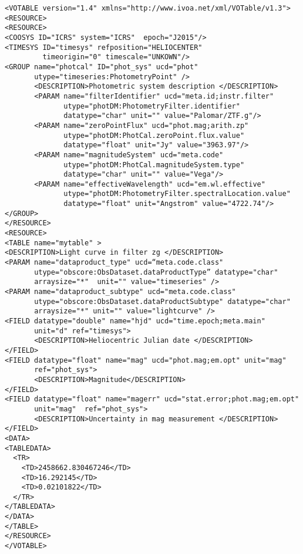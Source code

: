 \noindent
\begingroup\footnotesize
\begin{tcolorbox}
\begin{verbatim}
<VOTABLE version="1.4" xmlns="http://www.ivoa.net/xml/VOTable/v1.3">
<RESOURCE>
<RESOURCE>
<COOSYS ID="ICRS" system="ICRS"  epoch="J2015"/>
<TIMESYS ID="timesys" refposition="HELIOCENTER" 
         timeorigin="0" timescale="UNKOWN"/>
<GROUP name="photcal" ID="phot_sys" ucd="phot" 
       utype="timeseries:PhotometryPoint" /> 
       <DESCRIPTION>Photometric system description </DESCRIPTION>
       <PARAM name="filterIdentifier" ucd="meta.id;instr.filter" 
              utype="photDM:PhotometryFilter.identifier" 
              datatype="char" unit="" value="Palomar/ZTF.g"/>
       <PARAM name="zeroPointFlux" ucd="phot.mag;arith.zp" 
              utype="photDM:PhotCal.zeroPoint.flux.value" 
              datatype="float" unit="Jy" value="3963.97"/>
       <PARAM name="magnitudeSystem" ucd="meta.code" 
              utype="photDM:PhotCal.magnitudeSystem.type" 
              datatype="char" unit="" value="Vega"/>
       <PARAM name="effectiveWavelength" ucd="em.wl.effective" 
              utype="photDM:PhotometryFilter.spectralLocation.value" 
              datatype="float" unit="Angstrom" value="4722.74"/>
</GROUP>
</RESOURCE>
<RESOURCE>
<TABLE name="mytable" >
<DESCRIPTION>Light curve in filter zg </DESCRIPTION>
<PARAM name="dataproduct_type" ucd=“meta.code.class" 
       utype="obscore:ObsDataset.dataProductType” datatype="char" 
       arraysize="*"  unit="" value="timeseries" />
<PARAM name="dataproduct_subtype" ucd="meta.code.class" 
       utype="obscore:ObsDataset.dataProductSubtype" datatype="char" 
       arraysize="*" unit="" value="lightcurve" />
<FIELD datatype="double" name="hjd" ucd="time.epoch;meta.main" 
       unit="d" ref="timesys">
       <DESCRIPTION>Heliocentric Julian date </DESCRIPTION>
</FIELD>
<FIELD datatype="float" name="mag" ucd="phot.mag;em.opt" unit="mag" 
       ref="phot_sys">
       <DESCRIPTION>Magnitude</DESCRIPTION>
</FIELD>
<FIELD datatype="float" name="magerr" ucd="stat.error;phot.mag;em.opt" 
       unit="mag"  ref="phot_sys">
       <DESCRIPTION>Uncertainty in mag measurement </DESCRIPTION>
</FIELD>
<DATA>  
<TABLEDATA>
  <TR>
    <TD>2458662.830467246</TD>
    <TD>16.292145</TD>
    <TD>0.02101822</TD>
  </TR>
</TABLEDATA>
</DATA>
</TABLE>
</RESOURCE>
</VOTABLE>
\end{verbatim}
\end{tcolorbox}
\endgroup
